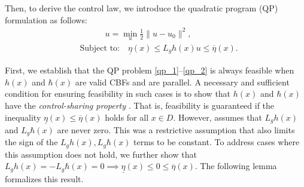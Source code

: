 \documentclass[letterpaper, 10 pt, conference]{ieeeconf}
\begin{document}
Then, to derive the control law, we introduce the quadratic program (QP)\cite{ames2014cbfqp_cruise} formulation as follows:
\begin{align}
    &\qquad \quad u = \min_{u} \frac{1}{2}\| u - u_0 \|^2, \label{qp_1}\\
    &\text{Subject to:} \quad  \underline{\eta}(x) \leq  L_gh(x) u \leq \overline{\eta}(x)\label{qp_2}.
\end{align}

First, we establish that the QP problem \eqref{qp_1}--\eqref{qp_2} is always feasible when $h(x)$ and $\hbar(x)$ are valid CBFs and are parallel. A necessary and sufficient condition for ensuring feasibility in such cases is to show that $h(x)$ and $\hbar(x)$ have the \textit{control-sharing property} \cite[Thm.~1]{XU2018195}. That is, feasibility is guaranteed if the inequality $\underline{\eta}(x) \leq \overline{\eta}(x)$ holds for all $x \in D$. However, \cite{XU2018195} assumes that $L_g h(x)$ and $L_g \hbar(x)$ are never zero. This was a restrictive assumption that also limits the sign of the $L_g h(x),L_g \hbar(x)$ terms to be constant. To address cases where this assumption does not hold, we further show that $L_g h(x) = -L_g \hbar(x) = 0 \implies \underline{\eta}(x) \leq 0 \leq \overline{\eta}(x)$. The following lemma formalizes this result.
\end{document}
